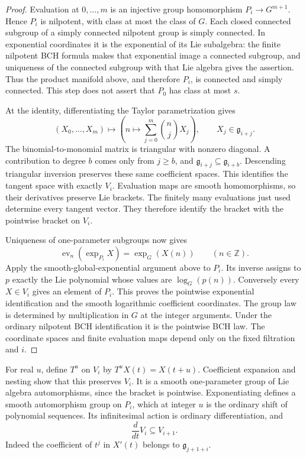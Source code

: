 \documentclass[11pt]{article}
\newcommand{\Z}{\mathbb Z}
\newcommand{\fg}{\mathfrak g}
\begin{document}
\begin{proof}
Evaluation at $0,\ldots,m$ is an injective group homomorphism
$P_i\longrightarrow G^{m+1}$. Hence $P_i$ is nilpotent, with class at most
the class of $G$. Each closed connected subgroup of a simply connected
nilpotent group is simply connected. In exponential coordinates it is
the exponential of its Lie subalgebra: the finite nilpotent BCH formula
makes that exponential image a connected subgroup, and uniqueness of
the connected subgroup with that Lie algebra gives the assertion.
Thus the product manifold above, and therefore $P_i$, is connected and
simply connected. This step does not assert that $P_0$ has class at most $s$.

At the identity, differentiating the Taylor parametrization gives
\[
 (X_0,\ldots,X_m)\longmapsto
 \left(n\longmapsto\sum_{j=0}^m\binom nj X_j\right),
 \qquad X_j\in\fg_{i+j}.
\]
The binomial-to-monomial matrix is triangular with nonzero diagonal.
A contribution to degree $b$ comes only from $j\geq b$, and
$\fg_{i+j}\subseteq\fg_{i+b}$. Descending triangular inversion preserves
these same coefficient spaces. This identifies the tangent space
with exactly $V_i$.
Evaluation maps are smooth homomorphisms, so their derivatives preserve
Lie brackets. The finitely many evaluations just used determine every
tangent vector. They therefore identify the bracket with the pointwise
bracket on $V_i$.

Uniqueness of one-parameter subgroups now gives
\[
 \operatorname{ev}_n(\exp_{P_i}X)=\exp_G(X(n))\qquad(n\in\Z).
\]
Apply the smooth-global-exponential argument above to $P_i$.
Its inverse assigns to $p$ exactly the Lie polynomial whose values
are $\log_G(p(n))$. Conversely every $X\in V_i$ gives an element of $P_i$.
This proves the pointwise exponential identification and the smooth
logarithmic coefficient coordinates. The group law is determined by
multiplication in $G$ at the integer arguments. Under the ordinary
nilpotent BCH identification it is the pointwise BCH law.
The coordinate spaces and finite evaluation maps depend only on the
fixed filtration and $i$.
\end{proof}

For real $u$, define $T^u$ on $V_i$ by $T^uX(t)=X(t+u)$.
Coefficient expansion and nesting show that this preserves $V_i$.
It is a smooth one-parameter group of Lie algebra automorphisms, since
the bracket is pointwise. Exponentiating defines a smooth automorphism
group on $P_i$, which at integer $u$ is the ordinary shift of polynomial
sequences. Its infinitesimal action is ordinary differentiation, and
\begin{equation}\label{eq:derivative}
 \frac{d}{dt}V_i\subseteq V_{i+1}.
\end{equation}
Indeed the coefficient of $t^j$ in $X'(t)$ belongs to
$\fg_{j+1+i}$.
\end{document}
